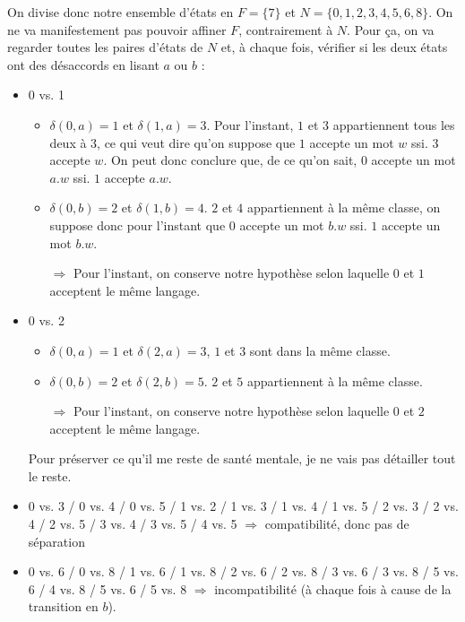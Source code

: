 \begin{correction*}


On divise donc notre ensemble d'états en $F = \{7\}$ et $N = \{0,1,2,3,4,5,6,8\}$. On ne va manifestement pas pouvoir affiner $F$, contrairement à $N$. Pour ça, on va regarder toutes les paires d'états de $N$ et, à chaque fois, vérifier si les deux états ont des désaccords en lisant $a$ ou $b$ :

\begin{itemize}
\item 0 vs. 1
\begin{itemize}
\item $\delta(0,a) = 1$ et $\delta(1,a) = 3$. Pour l'instant, $1$ et $3$ appartiennent tous les deux à $3$, ce qui veut dire qu'on suppose que $1$ accepte un mot $w$ ssi. $3$ accepte $w$. On peut donc conclure que, de ce qu'on sait, $0$ accepte un mot $a.w$ ssi. $1$ accepte $a.w$.
\item $\delta(0,b) = 2$ et $\delta(1,b) = 4$. $2$ et $4$ appartiennent à la même classe, on suppose donc pour l'instant que $0$ accepte un mot $b.w$ ssi. $1$ accepte un mot $b.w$.
\item[$\Rightarrow$] Pour l'instant, on conserve notre hypothèse selon laquelle $0$ et $1$ acceptent le même langage.
\end{itemize}
\item 0 vs. 2
\begin{itemize}
\item $\delta(0,a) = 1$ et $\delta(2,a) = 3$, $1$ et $3$ sont dans la même classe.
\item $\delta(0,b) = 2$ et $\delta(2,b) = 5$. $2$ et $5$ appartiennent à la même classe.
\item[$\Rightarrow$] Pour l'instant, on conserve notre hypothèse selon laquelle $0$ et $2$ acceptent le même langage.
\end{itemize}

\item[] Pour préserver ce qu'il me reste de santé mentale, je ne vais pas détailler tout le reste.

\item 0 vs. 3 / 0 vs. 4 / 0 vs. 5 / 1 vs. 2 / 1 vs. 3 / 1 vs. 4 / 1 vs. 5 / 2 vs. 3 / 2 vs. 4 / 2 vs. 5 / 3 vs. 4 / 3 vs. 5 / 4 vs. 5 $\Rightarrow$ compatibilité, donc pas de séparation

\item 0 vs. 6 / 0 vs. 8 / 1 vs. 6 / 1 vs. 8 / 2 vs. 6 / 2 vs. 8 / 3 vs. 6 / 3 vs. 8 / 5 vs. 6 / 4 vs. 8 / 5 vs. 6 / 5 vs. 8 $\Rightarrow$ incompatibilité (à chaque fois à cause de la transition en $b$).


\end{itemize}
\end{correction*}
